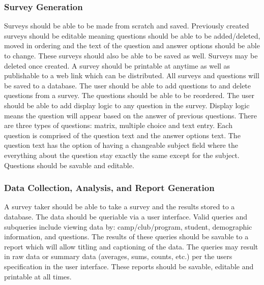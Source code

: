 \documentclass[letterpaper,10pt,titlepage, draftclsnofoot,onecolumn]{IEEEtran}
\begin{document}
\subsubsection{Survey Generation}
Surveys should be able to be made from scratch and saved. Previously created surveys should be editable 
meaning questions should be able to be added/deleted, moved in ordering and the text of the question 
and answer options should be able to change. These surveys should also be able to be saved as well. 
Surveys may be deleted once created. A survey should be printable at anytime as well as publishable to a
web link which can be distributed. All surveys and questions will be saved to a database.
The user should be able to add questions to and delete questions from a survey. The questions should be able to
be reordered. The user should be able to add display logic to any question in the survey. Display logic means the
question will appear based on the answer of previous questions.
There are three types of questions: matrix, multiple choice and text entry. Each question is comprised of the 
question text and the answer options text. The question text has the option of having a changeable subject
field where the everything about the question stay exactly the same except for the subject. Questions should
be savable and editable. \\

\subsubsection{Data Collection, Analysis, and Report Generation}
A survey taker should be able to take a survey and the results stored to a database. The data should be queriable
via a user interface. Valid queries and subqueries include viewing data by: camp/club/program, student, demographic 
information, and questions. The results of these queries should be savable to a report which will allow titling and captioning 
of the data. The queries may result in raw data or summary data (averages, sums, counts, etc.) per the users specification 
in the user interface. These reports should be savable, editable and printable at all times. 
\end{document}
